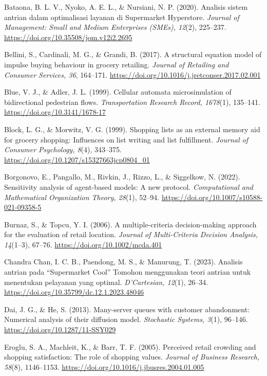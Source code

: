\documentclass[12pt]{article}
\newcommand{\aparef}[1]{\par\noindent\hangindent=0.5in\hangafter=1 #1\par}
\begin{document}
\aparef{Bataona, B. L. V., Nyoko, A. E. L., \& Nursiani, N. P. (2020). Analisis sistem antrian dalam optimalisasi layanan di Supermarket Hyperstore. \textit{Journal of Management: Small and Medium Enterprises (SMEs), 12}(2), 225--237. \url{https://doi.org/10.35508/jom.v12i2.2695}}

\aparef{Bellini, S., Cardinali, M. G., \& Grandi, B. (2017). A structural equation model of impulse buying behaviour in grocery retailing. \textit{Journal of Retailing and Consumer Services, 36}, 164--171. \url{https://doi.org/10.1016/j.jretconser.2017.02.001}}

\aparef{Blue, V. J., \& Adler, J. L. (1999). Cellular automata microsimulation of bidirectional pedestrian flows. \textit{Transportation Research Record, 1678}(1), 135--141. \url{https://doi.org/10.3141/1678-17}}

\aparef{Block, L. G., \& Morwitz, V. G. (1999). Shopping lists as an external memory aid for grocery shopping: Influences on list writing and list fulfillment. \textit{Journal of Consumer Psychology, 8}(4), 343--375. \url{https://doi.org/10.1207/s15327663jcp0804_01}}

\aparef{Borgonovo, E., Pangallo, M., Rivkin, J., Rizzo, L., \& Siggelkow, N. (2022). Sensitivity analysis of agent-based models: A new protocol. \textit{Computational and Mathematical Organization Theory, 28}(1), 52--94. \url{https://doi.org/10.1007/s10588-021-09358-5}}

\aparef{Burnaz, S., \& Topcu, Y. I. (2006). A multiple-criteria decision-making approach for the evaluation of retail location. \textit{Journal of Multi-Criteria Decision Analysis, 14}(1--3), 67--76. \url{https://doi.org/10.1002/mcda.401}}

\aparef{Chandra Chan, I. C. B., Paendong, M. S., \& Manurung, T. (2023). Analisis antrian pada ``Supermarket Cool'' Tomohon menggunakan teori antrian untuk menentukan pelayanan yang optimal. \textit{D'Cartesian, 12}(1), 26--34. \url{https://doi.org/10.35799/dc.12.1.2023.48046}}

\aparef{Dai, J. G., \& He, S. (2013). Many-server queues with customer abandonment: Numerical analysis of their diffusion model. \textit{Stochastic Systems, 3}(1), 96--146. \url{https://doi.org/10.1287/11-SSY029}}

\aparef{Eroglu, S. A., Machleit, K., \& Barr, T. F. (2005). Perceived retail crowding and shopping satisfaction: The role of shopping values. \textit{Journal of Business Research, 58}(8), 1146--1153. \url{https://doi.org/10.1016/j.jbusres.2004.01.005}}
\end{document}
